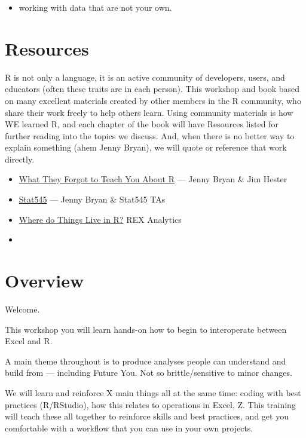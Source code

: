 \documentclass[]{book}
\providecommand{\tightlist}{%
  \setlength{\itemsep}{0pt}\setlength{\parskip}{0pt}}
\begin{document}
\begin{itemize}
\tightlist
\item
  working with data that are not your own.
\end{itemize}

\hypertarget{resources}{%
\section{Resources}\label{resources}}

R is not only a language, it is an active community of developers, users, and educators (often these traits are in each person). This workshop and book based on many excellent materials created by other members in the R community, who share their work freely to help others learn. Using community materials is how WE learned R, and each chapter of the book will have Resources listed for further reading into the topics we discuss. And, when there is no better way to explain something (ahem Jenny Bryan), we will quote or reference that work directly.

\begin{itemize}
\tightlist
\item
  \href{https://whattheyforgot.org/}{What They Forgot to Teach You About R} --- Jenny Bryan \& Jim Hester
\item
  \href{https://stat545.com/}{Stat545} --- Jenny Bryan \& Stat545 TAs
\item
  \href{http://rex-analytics.com/things-live-r-r-excel-users/}{Where do Things Live in R?} REX Analytics
\item
  \href{https://blog.shotwell.ca/posts/r_for_excel_users/}{}
\end{itemize}

\hypertarget{overview-1}{%
\section{Overview}\label{overview-1}}

Welcome.

This workshop you will learn hands-on how to begin to interoperate between Excel and R.

A main theme throughout is to produce analyses people can understand and build from --- including Future You.
Not so brittle/sensitive to minor changes.

We will learn and reinforce X main things all at the same time: coding with best practices (R/RStudio), how this relates to operations in Excel, Z. This training will teach these all together to reinforce skills and best practices, and get you comfortable with a workflow that you can use in your own projects.
\end{document}
